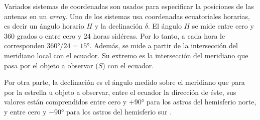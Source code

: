Variados sistemas de coordenadas son usados para especificar la posiciones de las antenas en un \textit{array}. Uno de los sistemas usa coordenadas ecuatoriales horarias, es decir un ángulo horario $H$ y la declinación $\delta$. El ángulo $H$ se mide entre cero y 360 grados o entre cero y 24 horas sidéreas. Por lo tanto, a cada hora le corresponden $360°/24 = 15°$. Además, se mide a partir de la intersección del meridiano local con el ecuador. Su extremo es la intersección del meridiano que pasa por el objeto a observar ($S$) con el ecuador.

Por otra parte, la declinación es el ángulo medido sobre el meridiano que para por la estrella u objeto a observar, entre el ecuador la dirección de éste, sus valores están comprendidos entre cero y $+90°$ para los astros del hemisferio norte, y entre cero y $-90°$ para los astros del hemisferio sur \citep{astroelemental}.

